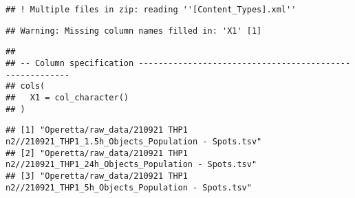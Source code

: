 \documentclass[
]{article}
\newenvironment{Shaded}{\begin{snugshade}}{\end{snugshade}}
\newcommand{\FunctionTok}[1]{\textcolor[rgb]{0.00,0.00,0.00}{#1}}
\newcommand{\NormalTok}[1]{#1}
\newcommand{\SpecialCharTok}[1]{\textcolor[rgb]{0.00,0.00,0.00}{#1}}
\begin{document}
\begin{verbatim}
## ! Multiple files in zip: reading ''[Content_Types].xml''
\end{verbatim}

\begin{verbatim}
## Warning: Missing column names filled in: 'X1' [1]
\end{verbatim}

\begin{verbatim}
## 
## -- Column specification --------------------------------------------------------
## cols(
##   X1 = col_character()
## )
\end{verbatim}

\begin{Shaded}
\end{Shaded}

\begin{verbatim}
## [1] "Operetta/raw_data/210921 THP1 n2//210921_THP1_1.5h_Objects_Population - Spots.tsv"
## [2] "Operetta/raw_data/210921 THP1 n2//210921_THP1_24h_Objects_Population - Spots.tsv" 
## [3] "Operetta/raw_data/210921 THP1 n2//210921_THP1_5h_Objects_Population - Spots.tsv"
\end{verbatim}
\end{document}

